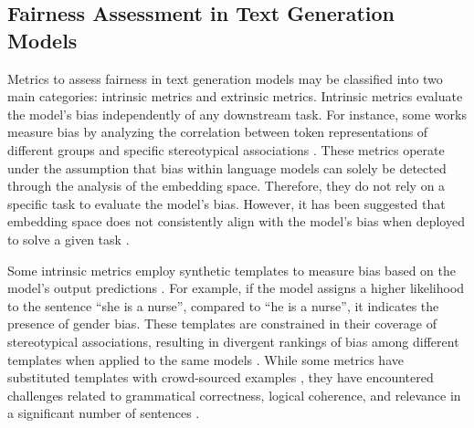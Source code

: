 \documentclass[letterpaper]{article} %
\newcommand{\goncalo}[1]
{\textcolor{orange}{{\bf}{\em #1}{\bf}}}
\begin{document}

\subsection{Fairness Assessment in Text Generation Models}\label{sec:fairness_metrics}
Metrics to assess fairness in text generation models may be classified into two main categories: intrinsic metrics and extrinsic metrics. Intrinsic metrics evaluate the model's bias independently of any downstream task. For instance, some works measure bias by analyzing the correlation between token representations of different groups and specific stereotypical associations \cite{caliskan2017semantics,guo2021detecting,may2019measuring}.  These metrics operate under the assumption that bias within language models can solely be detected through the analysis of the embedding space. Therefore, they do not rely on a specific task to evaluate the model's bias. However, it has been suggested that embedding space does not consistently align with the model's bias when deployed to solve a given task \cite{cao-etal-2022-intrinsic,delobelle-etal-2022-measuring}.

Some intrinsic metrics employ synthetic templates to measure bias based on the model's output predictions  \cite{webster2020measuring,kurita2019measuring}. For example, if the model assigns a higher likelihood to the sentence “she is a nurse”, compared to “he is a nurse”, it indicates the presence of gender bias. These templates are constrained in their coverage of stereotypical associations, resulting in divergent rankings of bias among different templates when applied to the same models \cite{delobelle-etal-2022-measuring}. While some metrics have substituted templates with crowd-sourced examples \cite{nadeem2021stereoset,nangia2020crows}, they have encountered challenges related to grammatical correctness, logical coherence, and relevance in a significant number of sentences \cite{blodgett2021stereotyping}. %
\end{document}
